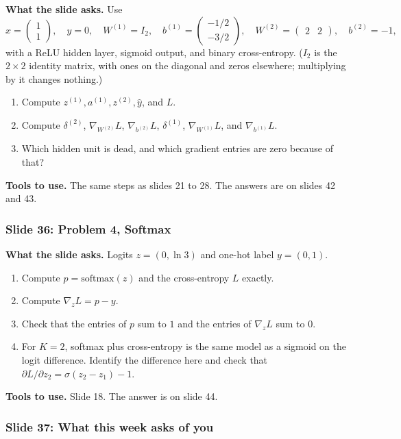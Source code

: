 \textbf{What the slide asks.} Use
\[
x=\begin{pmatrix}1\\1\end{pmatrix},\quad y=0,\quad W^{(1)}=I_2,\quad b^{(1)}=\begin{pmatrix}-1/2\\-3/2\end{pmatrix},\quad W^{(2)}=\begin{pmatrix}2&2\end{pmatrix},\quad b^{(2)}=-1,
\]
with a ReLU hidden layer, sigmoid output, and binary cross-entropy. ($I_2$ is the $2\times2$ identity matrix, with ones on the diagonal and zeros elsewhere; multiplying by it changes nothing.)
\begin{enumerate}
\item Compute $z^{(1)},a^{(1)},z^{(2)},\hat{y}$, and $L$.
\item Compute $\delta^{(2)}$, $\nabla_{W^{(2)}}L$, $\nabla_{b^{(2)}}L$, $\delta^{(1)}$, $\nabla_{W^{(1)}}L$, and $\nabla_{b^{(1)}}L$.
\item Which hidden unit is dead, and which gradient entries are zero because of that?
\end{enumerate}
\textbf{Tools to use.} The same steps as slides 21 to 28. The answers are on slides 42 and 43.

\subsubsection{Slide 36: Problem 4, Softmax}

\textbf{What the slide asks.} Logits $z=(0,\ln3)$ and one-hot label $y=(0,1)$.
\begin{enumerate}
\item Compute $p=\text{softmax}(z)$ and the cross-entropy $L$ exactly.
\item Compute $\nabla_zL=p-y$.
\item Check that the entries of $p$ sum to $1$ and the entries of $\nabla_zL$ sum to $0$.
\item For $K=2$, softmax plus cross-entropy is the same model as a sigmoid on the logit difference. Identify the difference here and check that $\partial L/\partial z_2=\sigma(z_2-z_1)-1$.
\end{enumerate}
\textbf{Tools to use.} Slide 18. The answer is on slide 44.

\subsubsection{Slide 37: What this week asks of you}

